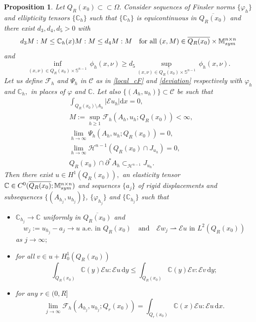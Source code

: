 \documentclass[reqno]{amsart}
\numberwithin{equation}{section}
\theoremstyle{plain}
\newtheorem{proposition}[theorem]{Proposition}
\theoremstyle{definition}
\newcommand{\C}{\mathbb{C}}
\renewcommand{\S}{\mathbb{S}}
\newcommand{\cH}{\mathcal{H}}
\newcommand{\cF}{\mathcal{F}}
\newcommand{\p}{\partial}
\newcommand{\wk}{\rightharpoonup}
\newcommand{\cl}[1]{\overline{#1}}
\renewcommand{\d}{\mathrm{d}}
\newcommand{\strictlyincluded}{\subset\subset}
\newcommand{\str}[1]{\mathcal{E}#1}
\newcommand{\mtwo}{\mathbb{M}^{n\times n}_{\rm sym}}
\newcommand{\admissible}{\mathcal{C}}
\begin{document}
\begin{proposition}\label{prop:conti_prop_3.4}
Let $Q_R(x_0)\strictlyincluded\Omega.$ Consider sequences of  Finsler norms $\{\varphi_h\}$ and ellipticity tensors $\{\C_h\}$ such that $\{\C_h\}$ is equicontinuous in $\cl{Q_R(x_0)}$ and there exist $d_3,d_4,d_5>0$ with  
%
\begin{equation}\label{elastic_bound_1}
d_3M:M\le \C_h(x)M:M \le d_4M:M\quad\text{for all $(x,M)\in\overline{Q_R(x_0)}\times\mtwo$} 
\end{equation}
and 
\begin{equation}\label{anisotropic_bound_1}
\inf\limits_{(x,\nu)\in \cl{Q_R(x_0)}\times \S^{n-1}}\,\phi_h(x,\nu) \ge d_5 \sup\limits_{(x,\nu)\in \cl{Q_R(x_0)}\times \S^{n-1}}\,\phi_h(x,\nu).
\end{equation}
%
Let us define
$\cF_h$ and $\Psi_h$ in $\admissible$ as in \eqref{local_cF} and \eqref{deviation} respectively with  $\varphi_h$ and $\C_h,$ in places of $\varphi$ and $\C.$
Let also $\{(A_h,u_h)\}\subset\admissible$ be such that
\begin{subequations}
\begin{align}
& \int_{Q_R(x_0)\setminus A_h} |\str{u_h}|\d x=0, \label{zero_eelastic_energy}\\
& M:=\sup\limits_{h\ge1} \cF_h(A_h,u_h;Q_R(x_0))<\infty,  \label{energy_bound_uniform}\\
& \lim\limits_{h\to\infty} \Psi_h(A_h,u_h;Q_R(x_0)) =0,   \label{seq_almost_min}\\
& \lim\limits_{h\to\infty} \cH^{n-1} (Q_R(x_0)\cap J_{u_h}) = 0,   \label{set_has_no_boundary}\\
& Q_R(x_0)\cap \p^*A_h\subset_{\cH^{n-1}} J_{u_h}. \label{red_bound_jumpset} 
\end{align}
\end{subequations}
%
Then there exist $u\in H^1(Q_R(x_0) ),$ an elasticity tensor $\C\in C^{0}(\overline{Q_R(x_0)};\mtwo)$ and sequences $\{a_j\}$ of rigid displacements and subsequences  $\{(A_{h_j},u_{h_j})\}$, $\{\varphi_{h_j}\}$ and $\{\C_{h_j}\}$  such that 
\begin{itemize}
\item[\rm(i)] $\C_{h_j}\to \C$ uniformly in $\overline{Q_R(x_0)}$
and 
$$
w_j:=u_{h_j} - a_j \to u \,\,\text{a.e.\  in $Q_R(x_0)$}\quad \text{and}
\quad \str{w_j}\wk\str{u}\,\,\text{in $L^2(Q_R(x_0))$}
$$
as $j\to \infty;$

\item[\rm(ii)] for all $v \in u+H_0^1 (Q_R(x_0))$ 
\begin{equation}\label{local_minimal_ekanku}
\int_{Q_R(x_0)} \C(y)\str{u}:\str{u}\,\d y\le 
\int_{Q_R(x_0)} \C(y)\str{v}:\str{v}\,\d y; 
\end{equation}
%

\item[\rm(iii)]  for any $r\in(0,R]$ 
\begin{equation}\label{functional_conv_o}
\lim\limits_{j\to\infty} \cF_h(A_{h_j},u_{h_j};Q_r(x_0)) = \int_{Q_r(x_0)} \C(x)\str{u}:\str{u}\,\d x. 
\end{equation}
%
\end{itemize}
\end{proposition}
\end{document}
